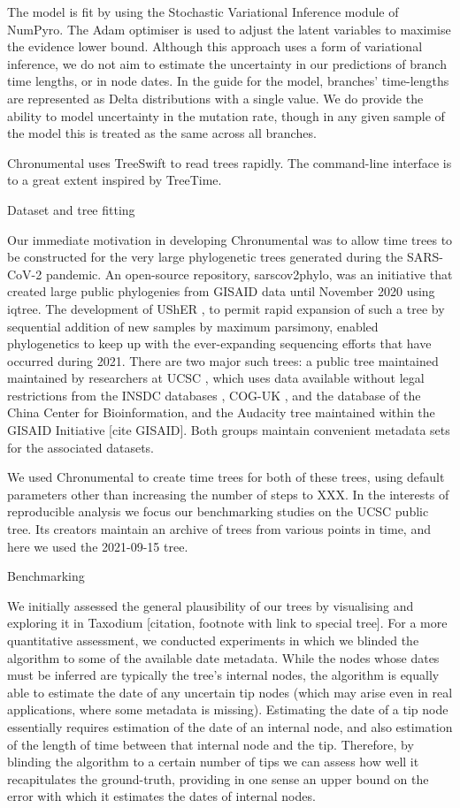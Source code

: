 The model is fit by using the Stochastic Variational Inference module of NumPyro. The Adam optimiser is used to adjust the latent variables to maximise the evidence lower bound. Although this approach uses a form of variational inference, we do not aim to estimate the uncertainty in our predictions of branch time lengths, or in node dates. In the guide for the model, branches' time-lengths are represented as Delta distributions with a single value. We do provide the ability to model uncertainty in the mutation rate, though in any given sample of the model this is treated as the same across all branches.

Chronumental uses TreeSwift to read trees rapidly. The command-line interface is to a great extent inspired by TreeTime.


Dataset and tree fitting

Our immediate motivation in developing Chronumental was to allow time trees to be constructed for the very large phylogenetic trees generated during the SARS-CoV-2 pandemic. An open-source repository, sarscov2phylo, was an initiative that created large public phylogenies from GISAID data until November 2020 using iqtree. The development of UShER \cite{Turakhia2021-la}, to permit rapid expansion of such a tree by sequential addition of new samples by maximum parsimony, enabled phylogenetics to keep up with the ever-expanding sequencing efforts that have occurred during 2021. There are two major such trees: a public tree maintained maintained by researchers at UCSC \cite{McBroome2021-fn}, which uses data available without legal restrictions from the INSDC databases \cite{Arita2021-dc}, COG-UK \cite{Nicholls2021-fz}, and the database of the China Center for Bioinformation, and the Audacity tree maintained within the GISAID Initiative [cite GISAID]. Both groups maintain convenient metadata sets for the associated datasets.

We used Chronumental to create time trees for both of these trees, using default parameters other than increasing the number of steps to XXX. In the interests of reproducible analysis we focus our benchmarking studies on the UCSC public tree. Its creators maintain an archive of trees from various points in time, and here we used the 2021-09-15 tree.


Benchmarking

We initially assessed the general plausibility of our trees by visualising and exploring it in Taxodium [citation, footnote with link to special tree]. For a more quantitative assessment, we conducted experiments in which we blinded the algorithm to some of the available date metadata. While the nodes whose dates must be inferred are typically the tree's internal nodes, the algorithm is equally able to estimate the date of any uncertain tip nodes (which may arise even in real applications, where some metadata is missing). Estimating the date of a tip node essentially requires estimation of the date of an internal node, and also estimation of the length of time between that internal node and the tip. Therefore, by blinding the algorithm to a certain number of tips we can assess how well it recapitulates the ground-truth, providing in one sense an upper bound on the error with which it estimates the dates of internal nodes.

